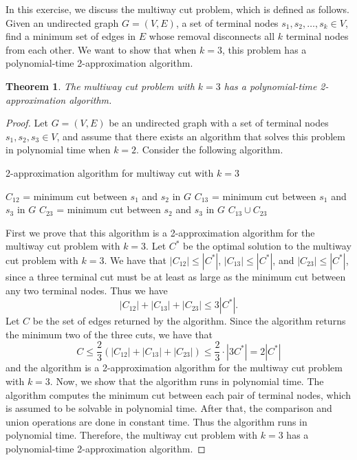 \documentclass{article}
\newtheorem{theorem}{Theorem}
\begin{document}
\noindent
In this exercise, we discuss the multiway cut problem, which is defined as follows.
Given an undirected graph $G = (V, E)$, a set of terminal nodes $s_1, s_2, \ldots, s_k \in V$,
find a minimum set of edges in $E$ whose removal disconnects all $k$ terminal nodes from each other.
We want to show that when $k = 3$, this problem has a polynomial-time 2-approximation algorithm.

\begin{theorem}
The multiway cut problem with $k = 3$ has a polynomial-time 2-approximation algorithm.
\end{theorem}

\begin{proof}
    Let $G = (V, E)$ be an undirected graph with a set of terminal nodes $s_1, s_2, s_3 \in V$,
    and assume that there exists an algorithm that solves this problem in polynomial time when $k = 2$.
    Consider the following algorithm.
    \begin{algorithm}[H]
        \caption{2-approximation algorithm for multiway cut with $k = 3$}
        $C_{12}$ = minimum cut between $s_1$ and $s_2$ in $G$\;
        $C_{13}$ = minimum cut between $s_1$ and $s_3$ in $G$\;
        $C_{23}$ = minimum cut between $s_2$ and $s_3$ in $G$\;
        \Return $C_{13} \cup C_{23}$\;
    \end{algorithm}
    First we prove that this algorithm is a 2-approximation algorithm for the multiway cut problem with $k = 3$.
    Let $C^*$ be the optimal solution to the multiway cut problem with $k = 3$.
    We have that $|C_{12}| \leq |C^*|$, $|C_{13}| \leq |C^*|$, and $|C_{23}| \leq |C^*|$, since a three terminal cut must be at least as large as the minimum cut between any two terminal nodes.
    Thus we have
    $$ |C_{12}| + |C_{13}| + |C_{23}| \leq 3|C^*| .$$
    Let $C$ be the set of edges returned by the algorithm.
    Since the algorithm returns the minimum two of the three cuts, we have that
    $$C \leq \frac{2}{3}(|C_{12}| + |C_{13}| + |C_{23}|) \leq \frac{2}{3} \cdot |3 C^*| = 2 |C^*|$$
    and the algorithm is a 2-approximation algorithm for the multiway cut problem with $k = 3$.
    Now, we show that the algorithm runs in polynomial time.
    The algorithm computes the minimum cut between each pair of terminal nodes, which is assumed to be solvable in polynomial time.
    After that, the comparison and union operations are done in constant time.
    Thus the algorithm runs in polynomial time.
    Therefore, the multiway cut problem with $k = 3$ has a polynomial-time 2-approximation algorithm.
\end{proof}
\end{document}

